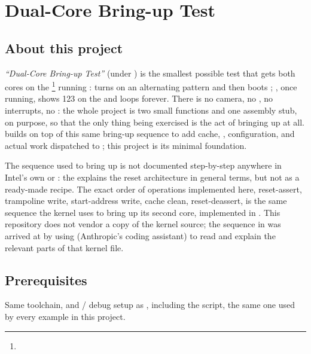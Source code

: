 \chapter{Dual-Core Bring-up Test}
\label{chap:fpgasteel-dualcore-bringup}

\section{About this project}
\label{sec:fpgasteel-dualcore-about}

\textit{``Dual-Core Bring-up Test''} (under ) is the smallest possible test that gets both  cores on the \footnote{} running :  turns on an alternating  pattern and then boots ; , once running, shows 123 on the  and loops forever. There is no camera, no , no interrupts, no : the whole project is two small  functions and one assembly stub, on purpose, so that the only thing being exercised is the act of bringing  up at all.  builds on top of this same bring-up sequence to add cache, ,  configuration, and actual work dispatched to ; this project is its minimal foundation.

The sequence used to bring  up is not documented step-by-step anywhere in Intel's own  \cite{CV-TRM} or : the  explains the reset architecture in general terms, but not as a ready-made recipe. The exact order of operations implemented here, reset-assert, trampoline write, start-address write, cache clean, reset-deassert, is the same sequence the  kernel uses to bring up its second core, implemented in . This repository does not vendor a copy of the  kernel source; the sequence in  was arrived at by using  (Anthropic's  coding assistant) to read and explain the relevant parts of that kernel file.

\section{Prerequisites}
\label{sec:fpgasteel-dualcore-prerequisites}

Same toolchain,  and / debug setup as , including the  script, the same one used by every example in this project.

